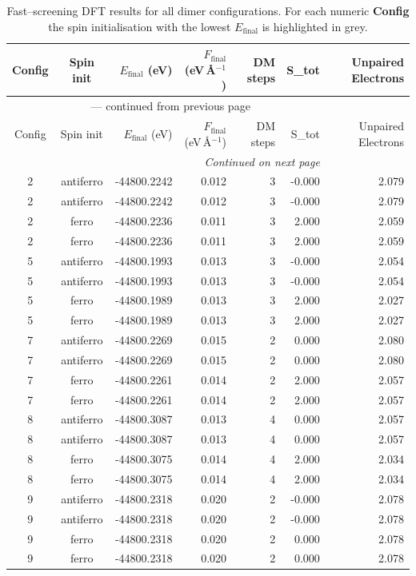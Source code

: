 
\begin{longtable}{@{}ccrrrrr@{}}
\caption{Fast–screening DFT results for all dimer configurations.
         For each numeric \textbf{Config} the spin initialisation with the
         lowest $E_{\mathrm{final}}$ is highlighted in grey.}\label{tab:dimer_full}\\
\toprule
Config & Spin init & $E_{\mathrm{final}}$ (eV) &
$F_{\mathrm{final}}$ (eV\,\AA$^{-1}$) & DM steps & S_{tot} & Unpaired Electrons\\
\midrule
\endfirsthead
\multicolumn{6}{c}{{\tablename}~\thetable{} — continued from previous page}\\
\toprule
Config & Spin init & $E_{\mathrm{final}}$ (eV) &
$F_{\mathrm{final}}$ (eV\,\AA$^{-1}$) & DM steps & S_{tot} & Unpaired Electrons\\
\midrule
\endhead
\midrule
\multicolumn{6}{r}{\emph{Continued on next page}}\\
\endfoot
\bottomrule
\endlastfoot
\rowcolor{gray!20} 2 & antiferro & -44800.2242 & 0.012 & 3 & -0.000 & 2.079 \\
2 & antiferro & -44800.2242 & 0.012 & 3 & -0.000 & 2.079 \\
2 & ferro & -44800.2236 & 0.011 & 3 & 2.000 & 2.059 \\
2 & ferro & -44800.2236 & 0.011 & 3 & 2.000 & 2.059 \\
\rowcolor{gray!20} 5 & antiferro & -44800.1993 & 0.013 & 3 & -0.000 & 2.054 \\
5 & antiferro & -44800.1993 & 0.013 & 3 & -0.000 & 2.054 \\
5 & ferro & -44800.1989 & 0.013 & 3 & 2.000 & 2.027 \\
5 & ferro & -44800.1989 & 0.013 & 3 & 2.000 & 2.027 \\
\rowcolor{gray!20} 7 & antiferro & -44800.2269 & 0.015 & 2 & 0.000 & 2.080 \\
7 & antiferro & -44800.2269 & 0.015 & 2 & 0.000 & 2.080 \\
7 & ferro & -44800.2261 & 0.014 & 2 & 2.000 & 2.057 \\
7 & ferro & -44800.2261 & 0.014 & 2 & 2.000 & 2.057 \\
\rowcolor{gray!20} 8 & antiferro & -44800.3087 & 0.013 & 4 & 0.000 & 2.057 \\
8 & antiferro & -44800.3087 & 0.013 & 4 & 0.000 & 2.057 \\
8 & ferro & -44800.3075 & 0.014 & 4 & 2.000 & 2.034 \\
8 & ferro & -44800.3075 & 0.014 & 4 & 2.000 & 2.034 \\
\rowcolor{gray!20} 9 & antiferro & -44800.2318 & 0.020 & 2 & -0.000 & 2.078 \\
9 & antiferro & -44800.2318 & 0.020 & 2 & -0.000 & 2.078 \\
9 & ferro & -44800.2318 & 0.020 & 2 & 0.000 & 2.078 \\
9 & ferro & -44800.2318 & 0.020 & 2 & 0.000 & 2.078 \\
\end{longtable}
